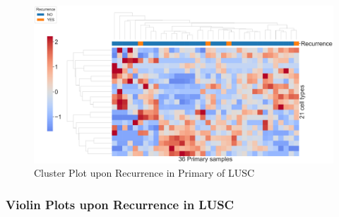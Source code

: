 \documentclass{beamer}
\begin{document}
\begin{frame}[allowframebreaks]
        \begin{figure}
            \includegraphics[width=0.9 \linewidth]{figures/BisqueRNA/clustermap/STAR.FPKM.GSE162498.SQC.Recurrence/Primary.pdf}
            \caption{Cluster Plot upon Recurrence in Primary of LUSC}
        \end{figure}
    \end{frame}

    \begin{frame}[allowframebreaks]
        \frametitle{Violin Plots upon Recurrence in LUSC}
    \end{frame}
\end{document}

